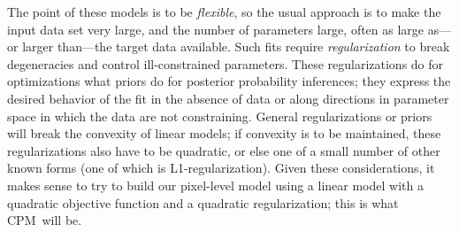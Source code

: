 \documentclass[12pt, preprint]{aastex}
\newcommand{\name}{CPM}
\begin{document}
The point of these models is to be \emph{flexible},
  so the usual approach is to make the input data set very large,
  and the number of parameters large,
  often as large as---or larger than---the target data available.
Such fits require \emph{regularization} to break degeneracies
  and control ill-constrained parameters.
These regularizations do for optimizations what priors do for posterior probability inferences;
  they express the desired behavior of the fit in the absence of data
  or along directions in parameter space in which the data are not constraining.
General regularizations or priors will break the convexity of linear models;
  if convexity is to be maintained, these regularizations also have to be quadratic,
  or else one of a small number of other known forms (one of which is L1-regularization).
Given these considerations, it makes sense to try to build our pixel-level model
  using a linear model with a quadratic objective function and a quadratic regularization;
  this is what \name\ will be.
\end{document}
